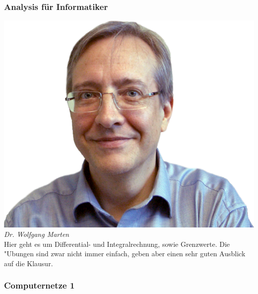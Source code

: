 \subsubsection{Analysis für Informatiker}

\includegraphics[width=0.8\linewidth]{bilder/dozenten/marten_frei.png}\\
\textit{Dr. Wolfgang Marten}\\

Hier geht es um Differential- und Integralrechnung, sowie Grenzwerte. %
Die "Ubungen sind zwar nicht immer einfach, geben aber einen sehr guten Ausblick auf die Klausur.
\subsubsection{Computernetze 1}

